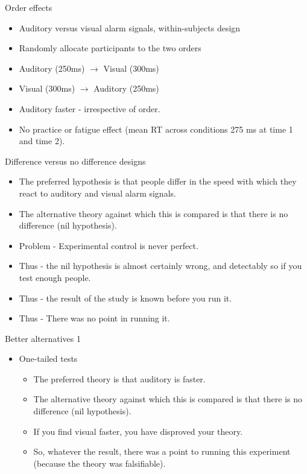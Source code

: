 \documentclass{beamer}
\begin{document}
\begin{frame}{Order effects}
\begin{itemize}
\item Auditory versus visual alarm signals, within-subjects design
\item Randomly allocate participants to the two orders
\item Auditory (250ms) $\to$ Visual (300ms)
\item Visual (300ms) $\to$ Auditory (250ms)
\item Auditory faster - irrespective of order.
\item No practice or fatigue effect (mean RT across conditions 275 ms at time 1 and time 2).
\end{itemize}
\end{frame}

\begin{frame}{Difference versus no difference designs}
\begin{itemize}
\item The preferred hypothesis is that people differ in the speed with which they react to auditory and visual alarm signals.
\item The alternative theory against which this is compared is that there is no difference (nil hypothesis).
\item Problem - Experimental control is never perfect.
\item Thus - the nil hypothesis is almost certainly wrong, and detectably so if you test enough people.
\item Thus - the result of the study is known before you run it.
\item Thus - There was no point in running it.
\end{itemize}
\end{frame}

\begin{frame}{Better alternatives 1}
\begin{itemize}
\item One-tailed tests
\begin{itemize}
\item The preferred theory is that auditory is faster.
\item The alternative theory against which this is compared is that there is no difference (nil hypothesis).
\item If you find visual faster, you have disproved your theory.
\item So, whatever the result, there was a point to running this experiment (because the theory was falsifiable).
\end{itemize}
\end{itemize}
\end{frame}
\end{document}

